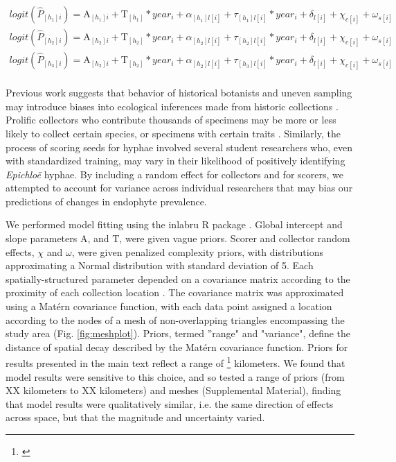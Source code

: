 \documentclass[11pt]{article}
\let\cite\citep
\newcommand{\tom}[2]{{\color{red}{#1}}\footnote{\textit{\color{red}{#2}}}}
\newcommand{\josh}[2]{{\color{orange}{#1}}\footnote{\textit{\color{orange}{#2}}}}
\begin{document}
\begin{subequations}
	\label{eq:trends}
	\begin{align}
		logit(\hat{P}_{[h_{1}]i}) =  \mathrm{A}_{[h_{1}]i} + \mathrm{T}_{[h_{1}]}*year_i  + \alpha_{[h_{1}]l[i]} + \tau_{[h_{1}]l[i]}*year_i  + \delta_{l[i]}+ \chi_{c[i]} + \omega_{s[i]} \\
		logit(\hat{P}_{[h_{2}]i}) = \mathrm{A}_{[h_{2}]i} + \mathrm{T}_{[h_{2}]}*year_i  + \alpha_{[h_{2}]l[i]} + \tau_{[h_{2}]l[i]}*year_i  + \delta_{l[i]}+ \chi_{c[i]} + \omega_{s[i]} \\
		logit(\hat{P}_{[h_{3}]i}) = \mathrm{A}_{[h_{2}]i} + \mathrm{T}_{[h_{2}]}*year_i  + \alpha_{[h_{2}]l[i]} + \tau_{[h_{3}]l[i]}*year_i  + \delta_{l[i]}+ \chi_{c[i]} + \omega_{s[i]}\\
	\end{align}
\end{subequations}


Previous work suggests that behavior of historical botanists and uneven sampling may introduce biases into ecological inferences made from historic collections \cite{kozlov2020biases}. 
Prolific collectors who contribute thousands of specimens may be more or less likely to collect certain species, or specimens with certain traits \cite{daru2018widespread}. 
Similarly, the process of scoring seeds for hyphae involved several student researchers who, even with standardized training, may vary in their likelihood of positively identifying \emph{Epichloë} hyphae. 
By including a random effect for collectors and for scorers, we attempted to account for variance across individual researchers that may bias our predictions of changes in endophyte prevalence.


We performed model fitting using the inlabru R package \citep{}.
Global intercept and slope parameters $\mathrm{A}$, and $\mathrm{T}$, were given vague priors.
Scorer and collector random effects, $\chi$ and $\omega$, were given penalized complexity priors, with distributions approximating a Normal distribution with standard deviation of 5. 
Each spatially-structured parameter depended on a covariance matrix according to the proximity of each collection location \citep{lindgren2011explicit,bakka2018spatial}. 
The covariance matrix was approximated using a Mat\'{e}rn covariance function, with each data point assigned a location according to the nodes of a mesh of non-overlapping triangles encompassing the study area (Fig. \ref{fig:meshplot}).
Priors, termed ''range" and "variance", define the distance of spatial decay described by the Mat\'{e}rn covariance function.
Priors for results presented in the main text reflect a range of \josh{XX}{} kilometers. 
We found that model results were sensitive to this choice, and so tested a range of priors (from XX kilometers to XX kilometers) and meshes (Supplemental Material), finding that model results were qualitatively similar, i.e. the same direction of effects across space, but that the magnitude and uncertainty varied. 
\end{document}
